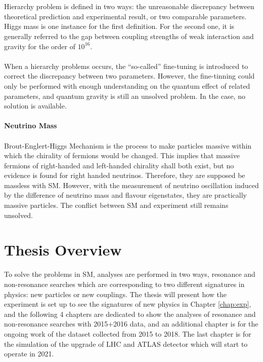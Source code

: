 \\
\\Hierarchy problem is defined in two ways: the unreasonable discrepancy between theoretical prediction and experimental result, or two comparable parameters. Higgs mass is one instance for the first definition. For the second one, it is generally referred to the gap between coupling strengths of weak interaction and gravity for the order of $10^{16}$.
\\
\\When a hierarchy problems occurs, the ``so-called'' fine-tuning is introduced to correct the discrepancy between two parameters. However, the fine-tinning could only be performed with enough understanding on the quantum effect of related parameters, and quantum gravity is still an unsolved problem. In the case, no solution is available.
\\
\\{\bf Neutrino Mass}
\\
\\Brout-Englert-Higgs Mechanism is the process to make particles massive within which the chirality of fermions would be changed. This implies that massive fermions of right-handed and left-handed chirality shall both exist, but no evidence is found for right handed neutrinos. Therefore, they are supposed be massless with SM. However, with the measurement of neutrino oscillation induced by the difference of neutrino mass and flavour eigenstates, they are practically massive particles. The conflict between SM and experiment still remains unsolved.
\section{Thesis Overview}
To solve the problems in SM, analyses are performed in two ways, resonance and non-resonance searches which are corresponding to two different signatures in physics: new particles or new couplings. The thesis will present how the experiment is set up to see the signatures of new physics in Chapter \ref{chap:exp}, and the following 4 chapters are dedicated to show the analyses of resonance and non-resonance searches with 2015+2016 data, and an additional chapter is for the ongoing work of the dataset collected from 2015 to 2018. The last chapter is for the simulation of the upgrade of LHC and ATLAS detector which will start to operate in 2021.

